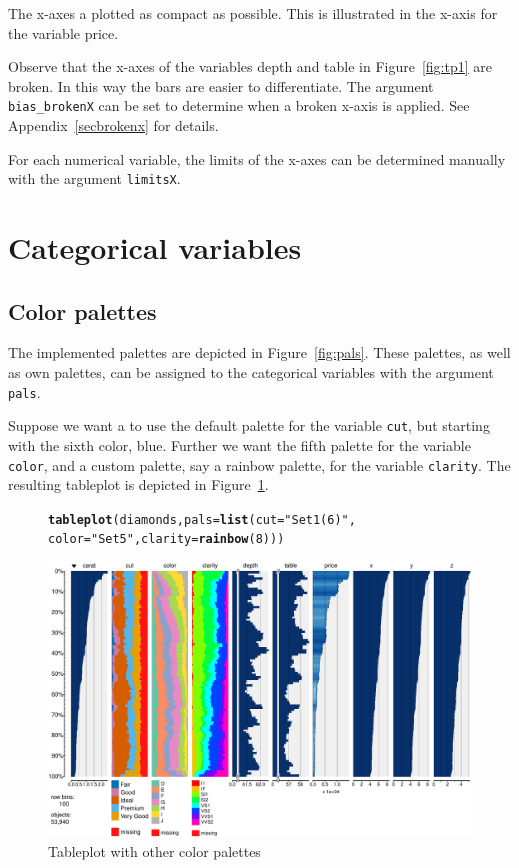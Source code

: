 \documentclass[11pt, fleqn, a4paper]{article}\usepackage[]{graphicx}\usepackage[]{color}
\makeatletter
\def\maxwidth{ %
  \ifdim\Gin@nat@width>\linewidth
    \linewidth
  \else
    \Gin@nat@width
  \fi
}
\newcommand{\hlnum}[1]{\textcolor[rgb]{0.686,0.059,0.569}{#1}}%
\newcommand{\hlstr}[1]{\textcolor[rgb]{0.192,0.494,0.8}{#1}}%
\newcommand{\hlstd}[1]{\textcolor[rgb]{0.345,0.345,0.345}{#1}}%
\newcommand{\hlkwc}[1]{\textcolor[rgb]{0.333,0.667,0.333}{#1}}%
\newcommand{\hlkwd}[1]{\textcolor[rgb]{0.737,0.353,0.396}{\textbf{#1}}}%
\newenvironment{kframe}{%
 \def\at@end@of@kframe{}%
 \ifinner\ifhmode%
  \def\at@end@of@kframe{\end{minipage}}%
  \begin{minipage}{\columnwidth}%
 \fi\fi%
 \def\FrameCommand##1{\hskip\@totalleftmargin \hskip-\fboxsep
 \colorbox{shadecolor}{##1}\hskip-\fboxsep
     \hskip-\linewidth \hskip-\@totalleftmargin \hskip\columnwidth}%
 \MakeFramed {\advance\hsize-\width
   \@totalleftmargin\z@ \linewidth\hsize
   \@setminipage}}%
 {\par\unskip\endMakeFramed%
 \at@end@of@kframe}
\newenvironment{knitrout}{}{} %
\makeatother
\begin{document}
The x-axes a plotted as compact as possible. This is illustrated in the x-axis for the variable price.

Observe that the x-axes of the variables depth and table in Figure~\ref{fig:tp1} are broken. In this way the bars are easier to differentiate. The argument {\tt bias\_brokenX} can be set to determine when a broken x-axis is applied. See Appendix~\ref{secbrokenx} for details.

For each numerical variable, the limits of the x-axes can be determined manually with the argument {\tt limitsX}.


\section{Categorical variables}
\subsection{Color palettes}
The implemented palettes are depicted in Figure~\ref{fig:pals}. These palettes, as well as own palettes, can be assigned to the categorical variables with the argument {\tt pals}.

Suppose we want a to use the default palette for the variable {\tt cut}, but starting with the sixth color, blue. Further we want the fifth palette for the variable {\tt color}, and a custom palette, say a rainbow palette, for the variable {\tt clarity}. The resulting tableplot is depicted in Figure~\ref{fig:tp5}.


\begin{figure}[htp]
\begin{knitrout}
\color{fgcolor}\begin{kframe}
\begin{alltt}
\hlkwd{tableplot}\hlstd{(diamonds,} \hlkwc{pals} \hlstd{=} \hlkwd{list}\hlstd{(}\hlkwc{cut} \hlstd{=} \hlstr{"Set1(6)"}\hlstd{,}
    \hlkwc{color} \hlstd{=} \hlstr{"Set5"}\hlstd{,} \hlkwc{clarity} \hlstd{=} \hlkwd{rainbow}\hlstd{(}\hlnum{8}\hlstd{)))}
\end{alltt}
\end{kframe}
\includegraphics[width=\maxwidth]{figure/chunk7} 

\end{knitrout}

\caption{Tableplot with other color palettes}
\label{fig:tp5}
\end{figure}
\end{document}
